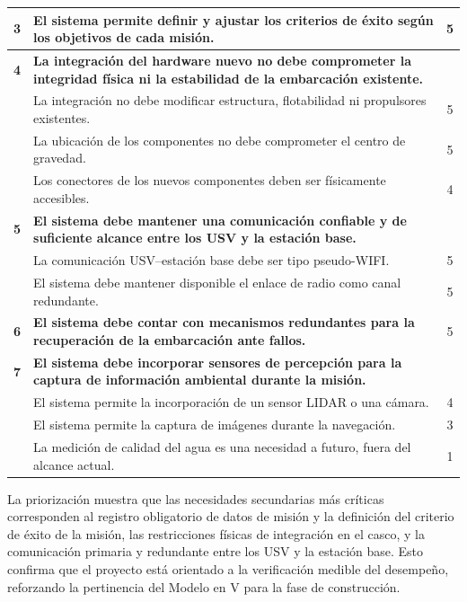 \begin{longtable}{|c|p{12cm}|c|}
\textbf{3} & \textbf{El sistema permite definir y ajustar los criterios de éxito según los objetivos de cada misión.} & 5\\ \hline

\textbf{4} & \textbf{La integración del hardware nuevo no debe comprometer la integridad física ni la estabilidad de la embarcación existente.} & \\ \hline
 & La integración no debe modificar estructura, flotabilidad ni propulsores existentes. & 5 \\ \hline
 & La ubicación de los componentes no debe comprometer el centro de gravedad. & 5 \\ \hline
 & Los conectores de los nuevos componentes deben ser físicamente accesibles. & 4 \\ \hline

\textbf{5} & \textbf{El sistema debe mantener una comunicación confiable y de suficiente alcance entre los USV y la estación base.} & \\ \hline
 & La comunicación USV--estación base debe ser tipo pseudo-WIFI. & 5 \\ \hline
 & El sistema debe mantener disponible el enlace de radio como canal redundante. & 5 \\ \hline

\textbf{6} & \textbf{El sistema debe contar con mecanismos redundantes para la recuperación de la embarcación ante fallos.} & 5\\ \hline

\textbf{7} & \textbf{El sistema debe incorporar sensores de percepción para la captura de información ambiental durante la misión.} & \\ \hline
 & El sistema permite la incorporación de un sensor LIDAR o una cámara. & 4 \\ \hline
 & El sistema permite la captura de imágenes durante la navegación. & 3 \\ \hline
 & La medición de calidad del agua es una necesidad a futuro, fuera del alcance actual. & 1 \\ \hline

\end{longtable}

La priorización muestra que las necesidades secundarias más críticas corresponden al registro obligatorio de datos de misión y la definición del criterio de
éxito de la misión, las restricciones físicas de integración en el casco, y la comunicación
primaria y redundante entre los USV y la estación base. Esto confirma que el proyecto está
orientado a la verificación medible del desempeño, reforzando la pertinencia del Modelo en V
para la fase de construcción.

